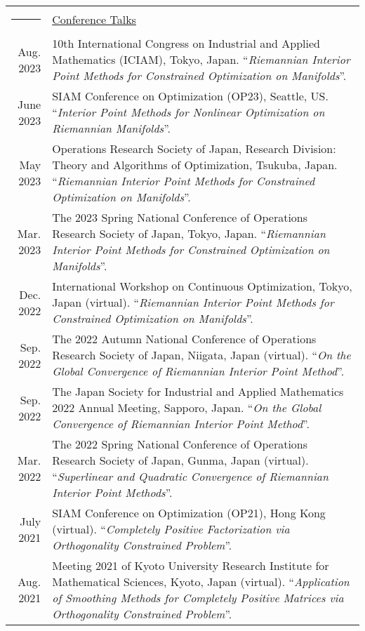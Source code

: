 \documentclass[letterpaper,11pt]{article}
\newcommand{\headingfont}{\LARGE \MakeUppercase }
\newenvironment{SectionTable}[1]{
	\renewcommand*{\arraystretch}{1.0}
	\setlength{\tabcolsep}{10pt}
	\begin{longtable}{Rp{5.2in}} 
		\rule{2.5cm}{4pt} 
		& \underline{#1} \\ %
	}
	{
	\end{longtable}\vspace{-.3cm}
}
\begin{document}
\begin{SectionTable}{\headingfont Conference Talks}
	Aug. 2023 & 10th International Congress on Industrial and Applied Mathematics (ICIAM), Tokyo, Japan. ``\textit{Riemannian Interior Point Methods for Constrained Optimization on Manifolds}''. \\
	
	June 2023 & SIAM Conference on Optimization (OP23), Seattle, US.  
	``\textit{Interior Point Methods for Nonlinear Optimization on Riemannian Manifolds}''. \\
	
	May 2023 & Operations Research Society of Japan, Research Division: Theory and Algorithms of Optimization, Tsukuba, Japan.  
	``\textit{Riemannian Interior Point Methods for Constrained Optimization on Manifolds}''. \\
	
	Mar. 2023 & The 2023 Spring National Conference of Operations Research Society of Japan, Tokyo, Japan.  
	``\textit{Riemannian Interior Point Methods for Constrained Optimization on Manifolds}''. \\
	
	Dec. 2022 & International Workshop on Continuous Optimization, Tokyo, Japan (virtual).  
	``\textit{Riemannian Interior Point Methods for Constrained Optimization on Manifolds}''. \\
	
	Sep. 2022 & The 2022 Autumn National Conference of Operations Research Society of Japan, Niigata, Japan (virtual). 
	``\textit{On the Global Convergence of Riemannian Interior Point Method}''.\\
	
	Sep. 2022 & The Japan Society for Industrial and Applied Mathematics 2022 Annual Meeting, Sapporo, Japan. 
	``\textit{On the Global Convergence of Riemannian Interior Point Method}''.\\
	
	Mar. 2022 & The 2022 Spring National Conference of Operations Research Society of Japan, Gunma, Japan (virtual).
	``\textit{Superlinear and Quadratic Convergence of Riemannian Interior Point Methods}''. \\
	
	July 2021 & SIAM Conference on Optimization (OP21), Hong Kong (virtual).  
	``\textit{Completely Positive Factorization via Orthogonality Constrained Problem}''. \\
	
	Aug. 2021 & Meeting 2021 of Kyoto University Research Institute for Mathematical Sciences, Kyoto, Japan (virtual). 
	``\textit{Application of Smoothing Methods for Completely Positive Matrices via Orthogonality Constrained Problem}''. \\
	

\end{SectionTable}
\end{document}
